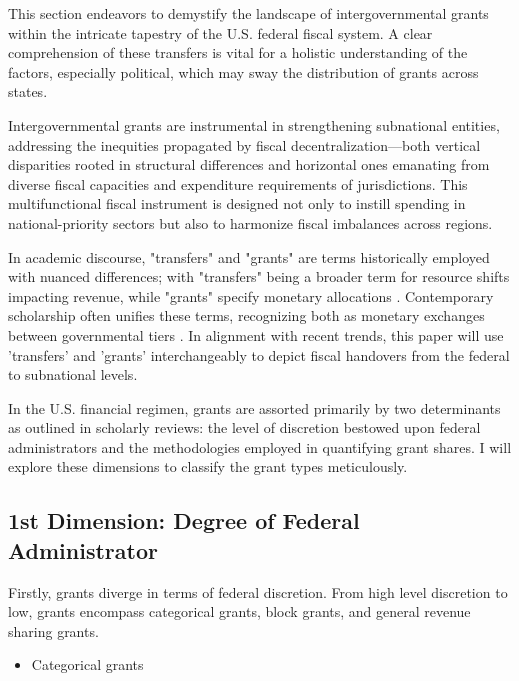 This section endeavors to demystify the landscape of intergovernmental grants within the intricate tapestry of the U.S. federal fiscal system. A clear comprehension of these transfers is vital for a holistic understanding of the factors, especially political, which may sway the distribution of grants across states.

Intergovernmental grants are instrumental in strengthening subnational entities, addressing the inequities propagated by fiscal decentralization—both vertical disparities rooted in structural differences and horizontal ones emanating from diverse fiscal capacities and expenditure requirements of jurisdictions. This multifunctional fiscal instrument is designed not only to instill spending in national-priority sectors but also to harmonize fiscal imbalances across regions.

In academic discourse, "transfers" and "grants" are terms historically employed with nuanced differences; with "transfers" being a broader term for resource shifts impacting revenue, while "grants" specify monetary allocations  \parencite{ter1997fiscal, Ahmad:1995,boadway1986federal}. Contemporary scholarship often unifies these terms, recognizing both as monetary exchanges between governmental tiers \parencite{abbott2012intergovernmental,lago2024effects,akai2019role}. In alignment with recent trends, this paper will use 'transfers' and 'grants' interchangeably to depict fiscal handovers from the federal to subnational levels.

In the U.S. financial regimen, grants are assorted primarily by two determinants as outlined in scholarly reviews\parencite{clemens2023intergovernmental, dilger2015federal}: the level of discretion bestowed upon federal administrators and the methodologies employed in quantifying grant shares. I will explore these dimensions to classify the grant types meticulously.

\subsection{1st Dimension: Degree of Federal Administrator}

Firstly, grants diverge in terms of federal discretion. From high level discretion to low, grants encompass categorical grants, block grants, and general revenue sharing grants.

\begin{itemize}
    \item{Categorical grants}
\end{itemize}


